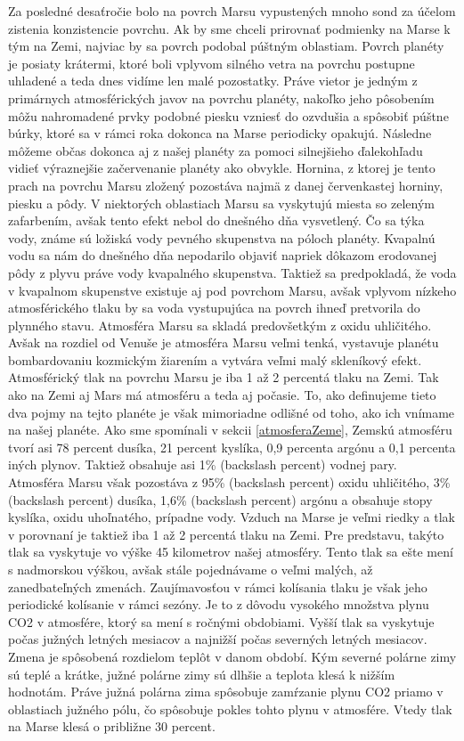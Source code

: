 Za posledné desaťročie bolo na povrch Marsu vypustených mnoho sond za účelom zistenia konzistencie povrchu. Ak by sme chceli prirovnať podmienky na Marse k tým na Zemi, najviac by sa povrch podobal púštným oblastiam. Povrch planéty je posiaty krátermi, ktoré boli vplyvom silného vetra na povrchu postupne uhladené a teda dnes vidíme len malé pozostatky. Práve vietor je jedným z primárnych atmosférických javov na povrchu planéty, nakoľko jeho pôsobením môžu nahromadené prvky podobné piesku vzniesť do ozvdušia a spôsobiť púštne búrky, ktoré sa v rámci roka dokonca na Marse periodicky opakujú. Následne môžeme občas dokonca aj z našej planéty za pomoci silnejšieho ďalekohľadu vidieť výraznejšie začervenanie planéty ako obvykle. Hornina, z ktorej je tento prach na povrchu Marsu zložený pozostáva najmä z danej červenkastej horniny, piesku a pôdy. V niektorých oblastiach Marsu sa vyskytujú miesta so zeleným zafarbením, avšak tento efekt nebol do dnešného dňa vysvetlený. Čo sa týka vody, známe sú ložiská vody pevného skupenstva na póloch planéty. Kvapalnú vodu sa nám do dnešného dňa nepodarilo objaviť napriek dôkazom erodovanej pôdy z plyvu práve vody kvapalného skupenstva. Taktiež sa predpokladá, že voda v kvapalnom skupenstve existuje aj pod povrchom Marsu, avšak vplyvom nízkeho atmosférického tlaku by sa voda vystupujúca na povrch ihneď pretvorila do plynného stavu. 
Atmosféra Marsu sa skladá predovšetkým z oxidu uhličitého. Avšak na rozdiel od Venuše je atmosféra Marsu veľmi tenká, vystavuje planétu bombardovaniu kozmickým žiarením a vytvára veľmi malý skleníkový efekt. Atmosférický tlak na povrchu Marsu je iba 1 až 2 percentá tlaku na Zemi. 
Tak ako na Zemi aj Mars má atmosféru a teda aj počasie. To, ako definujeme tieto dva pojmy na tejto planéte je však mimoriadne odlišné od toho, ako ich vnímame na našej planéte. Ako sme spomínali v sekcii \ref{atmosferaZeme}, Zemskú atmosféru tvorí asi 78 percent dusíka, 21 percent kyslíka, 0,9 percenta argónu a 0,1 percenta iných plynov. Taktiež obsahuje asi 1\% (backslash percent) vodnej pary. Atmosféra Marsu však pozostáva z 95\% (backslash percent) oxidu uhličitého, 3\% (backslash percent) dusíka, 1,6\% (backslash percent) argónu a obsahuje stopy kyslíka, oxidu uhoľnatého, prípadne vody. Vzduch na Marse je veľmi riedky a tlak v porovnaní je taktiež iba 1 až 2 percentá tlaku na Zemi. Pre predstavu, takýto tlak sa vyskytuje vo výške 45 kilometrov našej atmosféry. Tento tlak sa ešte mení s nadmorskou výškou, avšak stále pojednávame o veľmi malých, až zanedbateľných zmenách. Zaujímavosťou v rámci kolísania tlaku je však jeho periodické kolísanie v rámci sezóny. Je to z dôvodu vysokého množstva plynu CO2 v atmosfére, ktorý sa mení s ročnými obdobiami. Vyšší tlak sa vyskytuje počas južných letných mesiacov a najnižší počas severných letných mesiacov. Zmena je spôsobená rozdielom teplôt v danom období. Kým severné polárne zimy sú teplé a krátke, južné polárne zimy sú dlhšie a teplota klesá k nižším hodnotám. Práve južná polárna zima spôsobuje zamŕzanie plynu CO2 priamo v oblastiach južného pólu, čo spôsobuje pokles tohto plynu v atmosfére. Vtedy tlak na Marse klesá o približne 30 percent.
